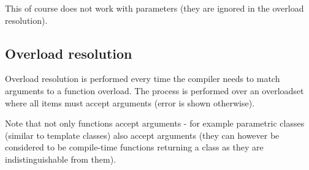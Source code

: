 This of course does not work with  parameters (they are ignored in the overload resolution).

\subsection{Overload resolution} \label{overloadResolution}
Overload resolution is performed every time the compiler needs to match arguments to a function overload. The process is performed over an overloadset where all items must accept arguments (error is shown otherwise).

Note that not only functions accept arguments - for example parametric classes (similar to template classes) also accept arguments (they can however be considered to be compile-time functions returning a class as they are indistinguishable from them).

